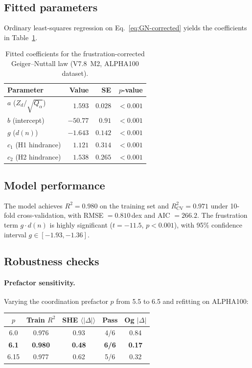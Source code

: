 \documentclass[aps,prc,twocolumn,showpacs,preprintnumbers,amsmath,amssymb]{revtex4-2}
\newcommand{\Qalpha}{Q_\alpha}
\newcommand{\Zd}{Z_d}
\newcommand{\dn}{d(n)}
\begin{document}
\subsection{Fitted parameters}

Ordinary least-squares regression on Eq.~\eqref{eq:GN-corrected}
yields the coefficients in Table~\ref{tab:coefficients}.

\begin{table}[h]
\centering
\caption{Fitted coefficients for the frustration-corrected
  Geiger--Nuttall law (V7.8~M2, ALPHA100 dataset).}
\label{tab:coefficients}
\begin{tabular}{@{}lrrr@{}}
\toprule
Parameter & Value & SE & $p$-value \\
\midrule
$a$ ($\Zd/\sqrt{\Qalpha}$) & $1.593$ & $0.028$ & $<0.001$ \\
$b$ (intercept)             & $-50.77$ & $0.91$ & $<0.001$ \\
$g$ ($\dn$)                 & $-1.643$ & $0.142$ & $<0.001$ \\
$c_1$ (H1 hindrance)        & $1.121$ & $0.314$ & $<0.001$ \\
$c_2$ (H2 hindrance)        & $1.538$ & $0.265$ & $<0.001$ \\
\bottomrule
\end{tabular}
\end{table}

\subsection{Model performance}

The model achieves $R^2 = 0.980$ on the training set and
$R^2_{\mathrm{CV}} = 0.971$ under 10-fold cross-validation,
with RMSE $= 0.810$\,dex and AIC $= 266.2$.
The frustration term $g \cdot \dn$ is highly significant
($t = -11.5$, $p < 0.001$), with 95\% confidence interval
$g \in [-1.93, -1.36]$.

\subsection{Robustness checks}

\paragraph{Prefactor sensitivity.}
Varying the coordination prefactor $p$ from 5.5 to 6.5 and
refitting on ALPHA100:

\begin{center}
\begin{tabular}{@{}ccccc@{}}
\toprule
$p$ & Train $R^2$ & SHE $\langle|\Delta|\rangle$ & Pass & Og $|\Delta|$ \\
\midrule
6.0 & 0.976 & 0.93 & 4/6 & 0.84 \\
\textbf{6.1} & \textbf{0.980} & \textbf{0.48} & \textbf{6/6} & \textbf{0.17} \\
6.15 & 0.977 & 0.62 & 5/6 & 0.32 \\
\bottomrule
\end{tabular}
\end{center}
\end{document}
